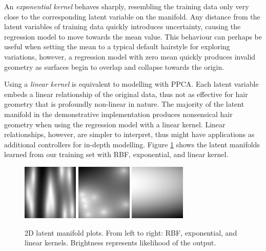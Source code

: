 \documentclass[ %
author={Dillon Keith Diep},
supervisor={Dr. Carl Henrik Ek},
degree={MEng},
title={ART-CG Hair:},
subtitle={Assisted Real-time Content Generation of Stylised Virtual Hair},
type={Research},
year={2017} ]{dissertation}
\begin{document}
An \textit{exponential kernel} behaves sharply, resembling the training data only very close to the corresponding latent variable on the manifold. Any distance from the latent variables of training data quickly introduces uncertainty, causing the regression model to move towards the mean value. This behaviour can perhaps be useful when setting the mean to a typical default hairstyle for exploring variations, however, a regression model with zero mean quickly produces invalid geometry as surfaces begin to overlap and collapse towards the origin.

Using a \textit{linear kernel} is equivalent to modelling with PPCA. Each latent variable embeds a linear relationship of the original data, thus not as effective for hair geometry that is profoundly non-linear in nature. The majority of the latent manifold in the demonstrative implementation produces nonsensical hair geometry when using the regression model with a linear kernel. Linear relationships, however, are simpler to interpret, thus might have applications as additional controllers for in-depth modelling. Figure \ref{fig:manifold} shows the latent manifolds learned from our training set with RBF, exponential, and linear kernel.

\begin{figure}[!h]
	\centering
	\caption{2D latent manifold plots. From left to right: RBF, exponential, and linear kernels. Brightness represents likelihood of the output.}
	\includegraphics[scale=1]{images/latentPlot_t10}
	\includegraphics[scale=1]{images/latentPlot_exp}
	\includegraphics[scale=1]{images/latentPlot_linear}
	\label{fig:manifold}
\end{figure}
\end{document}
